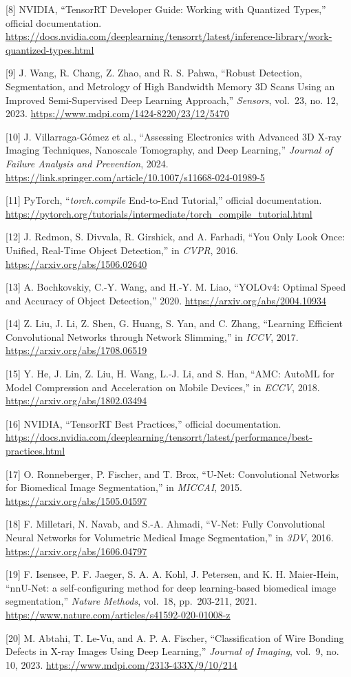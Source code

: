 {[}8{]} NVIDIA, ``TensorRT Developer Guide: Working with Quantized
Types,'' official documentation.
\url{https://docs.nvidia.com/deeplearning/tensorrt/latest/inference-library/work-quantized-types.html}

{[}9{]} J. Wang, R. Chang, Z. Zhao, and R. S. Pahwa, ``Robust Detection,
Segmentation, and Metrology of High Bandwidth Memory 3D Scans Using an
Improved Semi-Supervised Deep Learning Approach,'' \emph{Sensors},
vol.~23, no. 12, 2023. \url{https://www.mdpi.com/1424-8220/23/12/5470}

{[}10{]} J. Villarraga-Gómez et al., ``Assessing Electronics with
Advanced 3D X-ray Imaging Techniques, Nanoscale Tomography, and Deep
Learning,'' \emph{Journal of Failure Analysis and Prevention}, 2024.
\url{https://link.springer.com/article/10.1007/s11668-024-01989-5}

{[}11{]} PyTorch, ``\emph{torch.compile} End-to-End Tutorial,''
official documentation.
\url{https://pytorch.org/tutorials/intermediate/torch\_compile\_tutorial.html}

{[}12{]} J. Redmon, S. Divvala, R. Girshick, and A. Farhadi, ``You Only
Look Once: Unified, Real-Time Object Detection,'' in \emph{CVPR}, 2016.
\url{https://arxiv.org/abs/1506.02640}

{[}13{]} A. Bochkovskiy, C.-Y. Wang, and H.-Y. M. Liao, ``YOLOv4:
Optimal Speed and Accuracy of Object Detection,'' 2020.
\url{https://arxiv.org/abs/2004.10934}

{[}14{]} Z. Liu, J. Li, Z. Shen, G. Huang, S. Yan, and C. Zhang,
``Learning Efficient Convolutional Networks through Network Slimming,''
in \emph{ICCV}, 2017. \url{https://arxiv.org/abs/1708.06519}

{[}15{]} Y. He, J. Lin, Z. Liu, H. Wang, L.-J. Li, and S. Han, ``AMC:
AutoML for Model Compression and Acceleration on Mobile Devices,'' in
\emph{ECCV}, 2018. \url{https://arxiv.org/abs/1802.03494}

{[}16{]} NVIDIA, ``TensorRT Best Practices,'' official documentation.
\url{https://docs.nvidia.com/deeplearning/tensorrt/latest/performance/best-practices.html}

{[}17{]} O. Ronneberger, P. Fischer, and T. Brox, ``U-Net: Convolutional
Networks for Biomedical Image Segmentation,'' in \emph{MICCAI}, 2015.
\url{https://arxiv.org/abs/1505.04597}

{[}18{]} F. Milletari, N. Navab, and S.-A. Ahmadi, ``V-Net: Fully
Convolutional Neural Networks for Volumetric Medical Image
Segmentation,'' in \emph{3DV}, 2016. \url{https://arxiv.org/abs/1606.04797}

{[}19{]} F. Isensee, P. F. Jaeger, S. A. A. Kohl, J. Petersen, and K. H.
Maier-Hein, ``nnU-Net: a self-configuring method for deep learning-based
biomedical image segmentation,'' \emph{Nature Methods}, vol.~18,
pp.~203-211, 2021. \url{https://www.nature.com/articles/s41592-020-01008-z}

{[}20{]} M. Abtahi, T. Le-Vu, and A. P. A. Fischer, ``Classification of
Wire Bonding Defects in X-ray Images Using Deep Learning,''
\emph{Journal of Imaging}, vol.~9, no. 10, 2023.
\url{https://www.mdpi.com/2313-433X/9/10/214}

